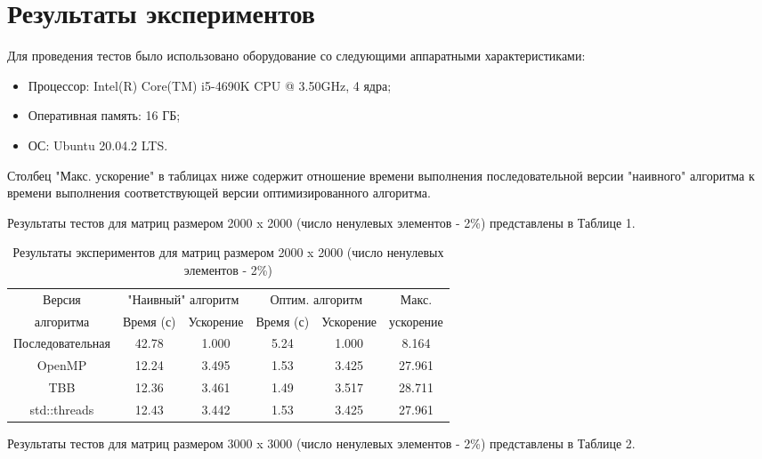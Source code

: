 \documentclass{report}
\begin{document}
	\section*{Результаты экспериментов}
	\par Для проведения тестов было использовано оборудование со следующими аппаратными характеристиками:
	\begin{itemize}
		\item Процессор: Intel(R) Core(TM) i5-4690K CPU @ 3.50GHz, 4 ядра;
		\item Оперативная память: 16 ГБ;
		\item ОС: Ubuntu 20.04.2 LTS.
	\end{itemize}
	\par Столбец "Макс. ускорение"{} в таблицах ниже содержит отношение времени выполнения последовательной версии "наивного"{} алгоритма к времени выполнения соответствующей версии оптимизированного алгоритма.
	\par Результаты тестов для матриц размером 2000 x 2000 (число ненулевых элементов - 2\%) представлены в Таблице 1.
	\begin{table}[!h]
		\caption{Результаты экспериментов для матриц размером 2000 x 2000 (число ненулевых элементов - 2\%)}
		\centering
		\begin{tabular}{|c|c|c|c|c|c|}
			\hline
			Версия &
			\multicolumn{2}{|c|}{"Наивный"{} алгоритм} &
			\multicolumn{2}{|c|}{Оптим. алгоритм} &
			Макс. \\
			\cline{2-5}
			алгоритма	&  Время (с)  &  Ускорение  &   Время (с)  &  Ускорение  &  ускорение   \\
			\hline
			Последовательная	&	42.78	&	1.000	&	5.24	&	1.000	&	8.164	\\
			\hline
			OpenMP			&	12.24	&	3.495	&	1.53	&	3.425	&	27.961	\\
			\hline
			TBB				&	12.36	&	3.461	&	1.49	&	3.517	&	28.711	\\
			\hline
			std::threads		&	12.43	&	3.442	&	1.53	&	3.425	&	27.961	\\
			\hline
		\end{tabular}
	\end{table}
	\par Результаты тестов для матриц размером 3000 x 3000 (число ненулевых элементов - 2\%) представлены в Таблице 2.
\end{document}
